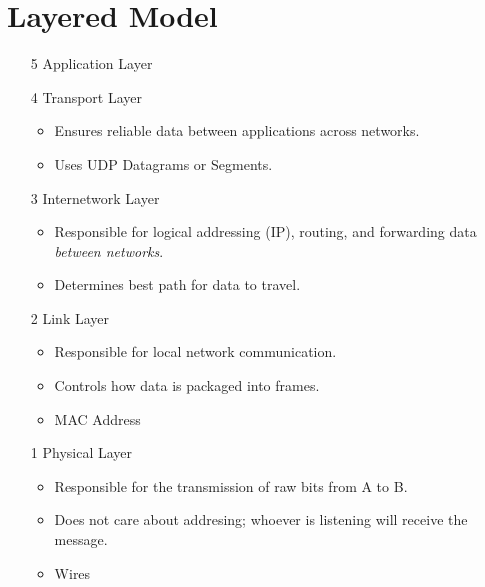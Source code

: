 \documentclass{article}
\begin{document}
\section{Layered Model}
\begin{enumerate}
    \item[5] Application Layer
    \item[4] Transport Layer
          \begin{itemize}
              \item Ensures reliable data between applications across networks.
              \item Uses UDP Datagrams or Segments.
          \end{itemize}
    \item[3] Internetwork Layer
          \begin{itemize}
              \item Responsible for logical addressing (IP), routing, and forwarding
                    data \emph{between networks}.
              \item Determines best path for data to travel.
          \end{itemize}
    \item[2] Link Layer
          \begin{itemize}
              \item Responsible for local network communication.
              \item Controls how data is packaged into frames.
          \end{itemize}
          \begin{itemize}
              \item MAC Address
          \end{itemize}
    \item[1] Physical Layer
          \begin{itemize}
              \item Responsible for the transmission of raw bits from A to B.
              \item Does not care about addresing; whoever is listening will receive the message.
          \end{itemize}
          \begin{itemize}
              \item Wires
          \end{itemize}
\end{enumerate}
\normalsize
\end{document}
